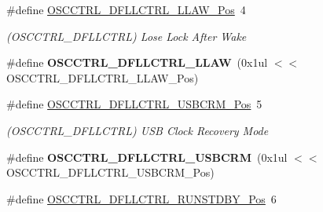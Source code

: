 \begin{DoxyCompactItemize}
\item 
\hypertarget{group___s_a_m_l21___o_s_c_c_t_r_l_gaca5d283cb24329c7156aa3e074c40a92}{}\#define \hyperlink{group___s_a_m_l21___o_s_c_c_t_r_l_gaca5d283cb24329c7156aa3e074c40a92}{O\+S\+C\+C\+T\+R\+L\+\_\+\+D\+F\+L\+L\+C\+T\+R\+L\+\_\+\+L\+L\+A\+W\+\_\+\+Pos}~4\label{group___s_a_m_l21___o_s_c_c_t_r_l_gaca5d283cb24329c7156aa3e074c40a92}

\begin{DoxyCompactList}\small\item\em (O\+S\+C\+C\+T\+R\+L\+\_\+\+D\+F\+L\+L\+C\+T\+R\+L) Lose Lock After Wake \end{DoxyCompactList}\item 
\hypertarget{group___s_a_m_l21___o_s_c_c_t_r_l_gaaa014924d5e0440e0e2a8724591ca049}{}\#define {\bfseries O\+S\+C\+C\+T\+R\+L\+\_\+\+D\+F\+L\+L\+C\+T\+R\+L\+\_\+\+L\+L\+A\+W}~(0x1ul $<$$<$ O\+S\+C\+C\+T\+R\+L\+\_\+\+D\+F\+L\+L\+C\+T\+R\+L\+\_\+\+L\+L\+A\+W\+\_\+\+Pos)\label{group___s_a_m_l21___o_s_c_c_t_r_l_gaaa014924d5e0440e0e2a8724591ca049}

\item 
\hypertarget{group___s_a_m_l21___o_s_c_c_t_r_l_gaf33e8e05f64e78c0813720b5d446ce97}{}\#define \hyperlink{group___s_a_m_l21___o_s_c_c_t_r_l_gaf33e8e05f64e78c0813720b5d446ce97}{O\+S\+C\+C\+T\+R\+L\+\_\+\+D\+F\+L\+L\+C\+T\+R\+L\+\_\+\+U\+S\+B\+C\+R\+M\+\_\+\+Pos}~5\label{group___s_a_m_l21___o_s_c_c_t_r_l_gaf33e8e05f64e78c0813720b5d446ce97}

\begin{DoxyCompactList}\small\item\em (O\+S\+C\+C\+T\+R\+L\+\_\+\+D\+F\+L\+L\+C\+T\+R\+L) U\+S\+B Clock Recovery Mode \end{DoxyCompactList}\item 
\hypertarget{group___s_a_m_l21___o_s_c_c_t_r_l_gaf6b609e328974e473832b0d0a8add3e8}{}\#define {\bfseries O\+S\+C\+C\+T\+R\+L\+\_\+\+D\+F\+L\+L\+C\+T\+R\+L\+\_\+\+U\+S\+B\+C\+R\+M}~(0x1ul $<$$<$ O\+S\+C\+C\+T\+R\+L\+\_\+\+D\+F\+L\+L\+C\+T\+R\+L\+\_\+\+U\+S\+B\+C\+R\+M\+\_\+\+Pos)\label{group___s_a_m_l21___o_s_c_c_t_r_l_gaf6b609e328974e473832b0d0a8add3e8}

\item 
\hypertarget{group___s_a_m_l21___o_s_c_c_t_r_l_ga30a5cb628e63dbd75824f8c6235392c2}{}\#define \hyperlink{group___s_a_m_l21___o_s_c_c_t_r_l_ga30a5cb628e63dbd75824f8c6235392c2}{O\+S\+C\+C\+T\+R\+L\+\_\+\+D\+F\+L\+L\+C\+T\+R\+L\+\_\+\+R\+U\+N\+S\+T\+D\+B\+Y\+\_\+\+Pos}~6\label{group___s_a_m_l21___o_s_c_c_t_r_l_ga30a5cb628e63dbd75824f8c6235392c2}


\end{DoxyCompactItemize}

